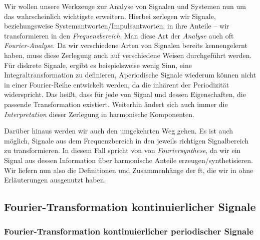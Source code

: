 Wir wollen unsere Werkzeuge zur Analyse von Signalen und Systemen nun um das wahrscheinlich wichtigste erweitern.
Hierbei zerlegen wir Signale, beziehungsweise Systemantworten/Impulsantworten, in ihre  Anteile -- wir transformieren in den \emph{Frequenzbereich}.
Man diese Art der \emph{Analyse} auch oft \emph{Fourier-Analyse}.
Da wir verschiedene Arten von Signalen bereits kennengelernt haben, muss diese Zerlegung auch auf verschiedene Weisen durchgeführt werden.
Für diskrete Signale, ergibt es beispielsweise wenig Sinn, eine Integraltransformation zu definieren, Aperiodische Signale wiederum können nicht in einer Fourier-Reihe entwickelt werden, da die inhärent der Periodizität widerspricht.
Das heißt, dass für jede  von Signal und dessen Eigenschaften, die passende Transformation existiert.
Weiterhin ändert sich auch immer die \emph{Interpretation} dieser Zerlegung in harmonische Komponenten.

Darüber hinaus werden wir auch den umgekehrten Weg gehen.
Es ist auch möglich, Signale aus dem Frequenzbereich in den jeweils richtigen Signalbereich zu transformieren. 
In diesem Fall spricht von von \emph{Fouriersynthese}, da wir ein Signal aus dessen Information über harmonische Anteile erzeugen/synthetisieren.
Wir liefern nun also die Definitionen und Zusammenhänge der \gls{ft}, die wir in  ohne Erläuterungen ausgenutzt haben.

\subsection{Fourier-Transformation kontinuierlicher Signale}\label{sec:fourier:cont}

\subsubsection{Fourier-Transformation kontinuierlicher periodischer Signale}\label{sec:fourier:cont:period}

